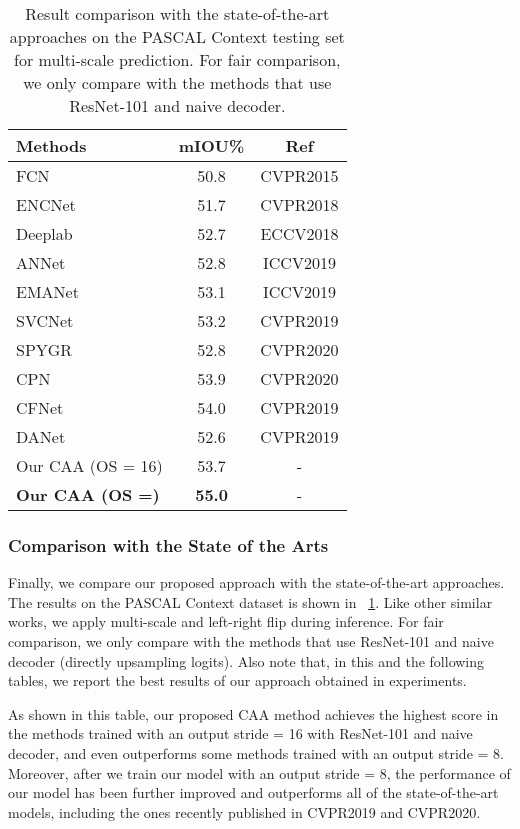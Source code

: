 \documentclass[journal]{IEEEtran}
\begin{document}
\begin{table}[t]
	\centering
\caption{Result comparison with the state-of-the-art approaches on the PASCAL Context testing set for multi-scale prediction. For fair comparison, we only compare with the methods that use ResNet-101 and naive decoder.}
	\begin{tabular}{l|c|c}
		\toprule[1pt]
		\rule{0pt}{2ex} Methods & mIOU\% & Ref \\
		\midrule[0.5pt]
		\midrule[0.5pt]
		FCN~\cite{cFCN} & 50.8 & CVPR2015 \\
		ENCNet~\cite{cENCNet} & 51.7 & CVPR2018 \\
		Deeplab~\cite{cDeepLabV3Plus} & 52.7 & ECCV2018\\
		ANNet~\cite{cANNN} & 52.8 & ICCV2019 \\
		EMANet~\cite{cEMANet} & 53.1 & ICCV2019 \\
		SVCNet~\cite{cSVCNet} & 53.2 & CVPR2019 \\
		SPYGR~\cite{cSPYGR} & 52.8 & CVPR2020 \\
		CPN~\cite{cCPN} & 53.9 & CVPR2020 \\
		CFNet~\cite{cCFNet} & 54.0 & CVPR2019 \\
		\midrule[0.5pt]
		DANet~\cite{cDualAttention} & 52.6 & CVPR2019\\
		\midrule[0.5pt]
		Our CAA (OS = 16) & 53.7 & - \\
		\textbf{Our CAA (OS =\enspace8)} & \textbf{55.0} & - \\
		\bottomrule[1pt]
	\end{tabular}
	\label{tabPascalContextSOTA}
\end{table}

\subsubsection{Comparison with the State of the Arts}
\label{lab:PascalCtxSOTA}

Finally, we compare our proposed approach with the state-of-the-art approaches. 
The results on the PASCAL Context dataset is shown in \tablename{~\ref{tabPascalContextSOTA}}. 
Like other similar works, we apply multi-scale and left-right flip during inference. 
For fair comparison, we only compare with the methods that use ResNet-101 and naive decoder (directly upsampling logits). 
Also note that, in this and the following tables, we report the best results of our approach obtained in experiments. 

As shown in this table, our proposed CAA method achieves the highest score in the methods trained with an output stride = 16 with ResNet-101 and naive decoder, and even outperforms some methods trained with an output stride = 8.
Moreover, after we train our model with an output stride = 8, the performance of our model has been further improved and outperforms all of the state-of-the-art models, including the ones recently published in CVPR2019 and CVPR2020.
\end{document}
